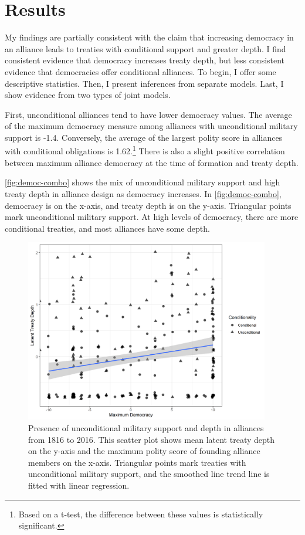 \documentclass[12pt]{article}
\begin{document}
\section{Results}


My findings are partially consistent with the claim that increasing democracy in an alliance leads to treaties with conditional support and greater depth. 
I find consistent evidence that democracy increases treaty depth, but less consistent evidence that democracies offer conditional alliances. 
To begin, I offer some descriptive statistics.
Then, I present inferences from separate models. 
Last, I show evidence from two types of joint models. 


First, unconditional alliances tend to have lower democracy values. 
The average of the maximum democracy measure among alliances with unconditional military support is -1.4. 
Conversely, the average of the largest polity score in alliances with conditional obligations is 1.62.\footnote{Based on a t-test, the difference between these values is statistically significant.} 
There is also a slight positive correlation between maximum alliance democracy at the time of formation and treaty depth. 


\autoref{fig:democ-combo} shows the mix of unconditional military support and high treaty depth in alliance design as democracy increases. 
In \autoref{fig:democ-combo}, democracy is on the x-axis, and treaty depth is on the y-axis.
Triangular points mark unconditional military support. 
At high levels of democracy, there are more conditional treaties, and most alliances have some depth. 


\begin{figure}[hbtp]
\centering
\includegraphics[width=0.95\textwidth]{../figures/democ-combo.png}
\caption{Presence of unconditional military support and depth in alliances from 1816 to 2016. This scatter plot shows mean latent treaty depth on the y-axis and the maximum polity score of founding alliance members on the x-axis. Triangular points mark treaties with unconditional military support, and the smoothed line trend line is fitted with linear regression.}
\label{fig:democ-combo}
\end{figure}
\end{document}
